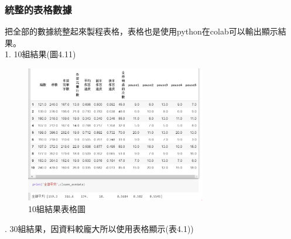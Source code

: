 \subsubsection{統整的表格數據}
把全部的數據統整起來製程表格，表格也是使用python在colab可以輸出顯示結果。\\
1. 10組結果(圖4.11)
	\begin{figure}[H] 
	\centering 
	\includegraphics[width=0.7\textwidth]{4_7.png} 
	\caption{10組結果表格圖} 
	\label{Fig.4.7} 
	\end{figure}
. 30組結果，因資料較龐大所以使用表格顯示(表4.1))\\
